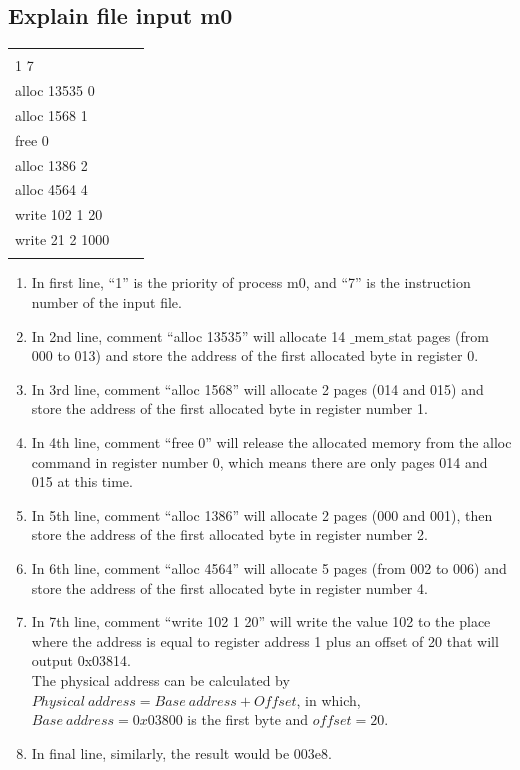 \documentclass[13pt,a4paper]{article}
\begin{document}
		\subsection{Explain file input m0}
				\begin{center}
					\begin{tabular}{lll}
						\hline \\
						1 7 & & \\
						alloc 13535 0 & & \\
						alloc 1568 1 \\
						free 0 \\
						alloc 1386 2 \\
						alloc 4564 4 \\
						write 102 1 20 \\
						write 21 2 1000 \\
						\hline\\
					\end{tabular}
				\end{center}
				\begin{enumerate}[-]
					\item In first line, ``1'' is the priority of process m0, and ``7'' is the instruction number of the input file.
					\item In 2nd line, comment ``alloc 13535'' will allocate 14 $\_$mem$\_$stat pages (from 000 to 013) and store the address of the first allocated byte in register 0.
					\item In 3rd line, comment ``alloc 1568'' will allocate 2 pages (014 and 015) and store the address of the first allocated byte in register number 1.
					\item In 4th line, comment ``free 0'' will release the allocated memory from the alloc command in register number 0, which means there are only pages 014 and 015 at this time.
					\item In 5th line, comment ``alloc 1386'' will allocate 2 pages (000 and 001), then store the address of the first allocated byte in register number 2.
					\item In 6th line, comment ``alloc 4564'' will allocate 5 pages (from 002 to 006) and store the address of the first allocated byte in register number 4.
					\item In 7th line, comment ``write 102 1 20'' will write the value 102 to the place where the address is equal to register address 1 plus an offset of 20 that will output 0x03814.\\ The physical address can be calculated by $ Physical\ address = Base\ address + Offset$, in which, $Base\ address = 0x03800$ is the first byte and $offset = 20$.  
					\item In final line, similarly, the result would be 003e8.
				\end{enumerate}
\end{document}
